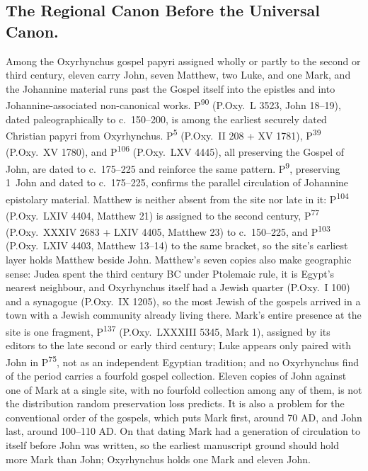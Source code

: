 \subsection{The Regional Canon Before the Universal Canon.}\label{subsec:regional-canon-before-universal}

Among the Oxyrhynchus gospel papyri assigned wholly or partly to the second or third century, eleven carry John, seven Matthew, two Luke, and one Mark, and the Johannine material runs past the Gospel itself into the epistles and into Johannine-associated non-canonical works.
P\textsuperscript{90} (P.Oxy.\ L 3523, John 18--19), dated paleographically to c.~150--200, is among the earliest securely dated Christian papyri from Oxyrhynchus.
P\textsuperscript{5} (P.Oxy.\ II 208 + XV 1781), P\textsuperscript{39} (P.Oxy.\ XV 1780), and P\textsuperscript{106} (P.Oxy.\ LXV 4445), all preserving the Gospel of John, are dated to c.~175--225 and reinforce the same pattern.
P\textsuperscript{9}, preserving 1~John and dated to c.~175--225, confirms the parallel circulation of Johannine epistolary material.
Matthew is neither absent from the site nor late in it: P\textsuperscript{104} (P.Oxy.\ LXIV 4404, Matthew 21) is assigned to the second century, P\textsuperscript{77} (P.Oxy.\ XXXIV 2683 + LXIV 4405, Matthew 23) to c.~150--225, and P\textsuperscript{103} (P.Oxy.\ LXIV 4403, Matthew 13--14) to the same bracket, so the site's earliest layer holds Matthew beside John.
Matthew's seven copies also make geographic sense: Judea spent the third century BC under Ptolemaic rule, it is Egypt's nearest neighbour, and Oxyrhynchus itself had a Jewish quarter (P.Oxy.\ I 100) and a synagogue (P.Oxy.\ IX 1205), so the most Jewish of the gospels arrived in a town with a Jewish community already living there.
Mark's entire presence at the site is one fragment, P\textsuperscript{137} (P.Oxy.\ LXXXIII 5345, Mark 1), assigned by its editors to the late second or early third century; Luke appears only paired with John in P\textsuperscript{75}, not as an independent Egyptian tradition; and no Oxyrhynchus find of the period carries a fourfold gospel collection.
Eleven copies of John against one of Mark at a single site, with no fourfold collection among any of them, is not the distribution random preservation loss predicts.
It is also a problem for the conventional order of the gospels, which puts Mark first, around 70 AD, and John last, around 100--110 AD.
On that dating Mark had a generation of circulation to itself before John was written, so the earliest manuscript ground should hold more Mark than John; Oxyrhynchus holds one Mark and eleven John.
